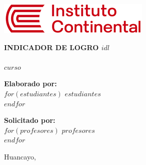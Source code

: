 \begin{titlepage}
	\thispagestyle{fancy}
	\centering
	\vspace*{2cm}
	\includegraphics[width=7.3cm]{logo_continental.png}
	\vspace{2cm}
	
	{\LARGE\textbf{INDICADOR DE LOGRO $idl$}}\\[0.3cm]
	\begingroup
	\centering
	\color[HTML]{a6a6a6}
	\makebox[\textwidth]{\rule{11.35cm}{1.5pt}}
	\endgroup
	\\[0.3cm]
	{\huge $curso$}\\[0.3cm]
	\begingroup
	\centering
	\color[HTML]{a6a6a6}
	\makebox[\textwidth]{\rule{11.35cm}{1.5pt}}
	\endgroup
	\vspace{2cm}
	
	{\Large\textbf{Elaborado por:}}\\\vspace{0.3cm}
	\large
	$for(estudiantes)$
	$estudiantes$\\
	$endfor$
	
	\vspace{1.5cm}
	{\Large\textbf{Solicitado por:}}\\\vspace{0.3cm}
	\large
	$for(profesores)$
	$profesores$\\
	$endfor$
	
	\vspace{2cm}
	{\large Huancayo, \the\year}
\end{titlepage}